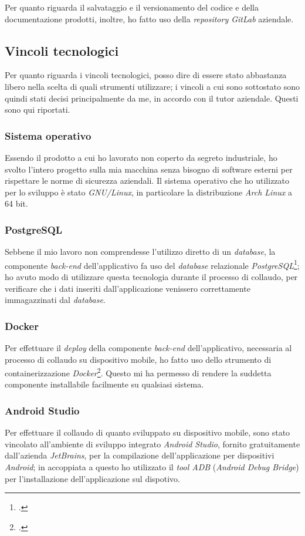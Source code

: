 Per quanto riguarda il salvataggio e il versionamento del codice e della documentazione prodotti, inoltre, ho fatto uso della \textit{repository GitLab} aziendale.

\subsection{Vincoli tecnologici}

Per quanto riguarda i vincoli tecnologici, posso dire di essere stato abbastanza libero nella scelta di quali strumenti utilizzare; i vincoli a cui sono sottostato sono quindi stati decisi principalmente da me, in accordo con il tutor aziendale. Questi sono qui riportati.

\subsubsection*{Sistema operativo}

Essendo il prodotto a cui ho lavorato non coperto da segreto industriale, ho svolto l'intero progetto sulla mia macchina senza bisogno di software esterni per rispettare le norme di sicurezza aziendali. Il sistema operativo che ho utilizzato per lo sviluppo è stato \textit{GNU/Linux}, in particolare la distribuzione \textit{Arch Linux} a 64 bit.

\subsubsection*{PostgreSQL}
Sebbene il mio lavoro non comprendesse l'utilizzo diretto di un \textit{database}, la componente \textit{back-end} dell'applicativo fa uso del \textit{database} relazionale \textit{PostgreSQL}\footcite{tec:postgres}; ho avuto modo di utilizzare questa tecnologia durante il processo di collaudo, per verificare che i dati inseriti dall'applicazione venissero correttamente immagazzinati dal \textit{database}.

\subsubsection*{Docker}
Per effettuare il \textit{deploy} della componente \textit{back-end} dell'applicativo, necessaria al processo di collaudo su dispositivo mobile, ho fatto uso dello strumento di containerizzazione \textit{Docker}\footcite{tec:docker}. Questo mi ha permesso di rendere la suddetta componente installabile facilmente su qualsiasi sistema.

\subsubsection*{Android Studio}
Per effettuare il collaudo di quanto sviluppato su dispositivo mobile, sono stato vincolato all'ambiente di sviluppo integrato \textit{Android Studio}, fornito gratuitamente dall'azienda \textit{JetBrains}, per la compilazione dell'applicazione per dispositivi \textit{Android}; in accoppiata a questo ho utilizzato il \textit{tool ADB} (\textit{Android Debug Bridge}) per l'installazione dell'applicazione sul dispotivo.

